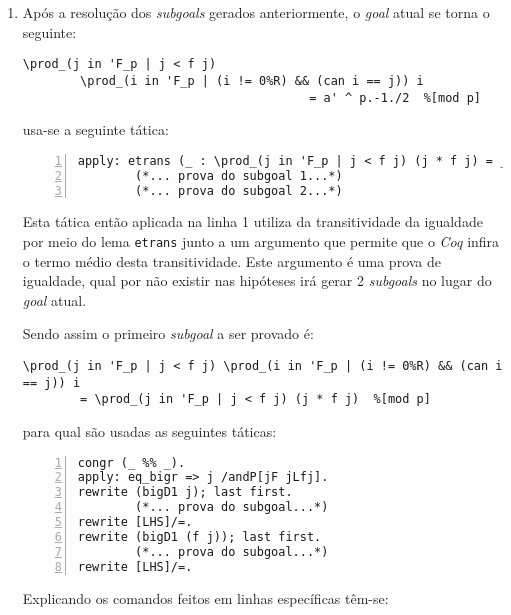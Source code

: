 \begin{enumerate}[label=\textbf{\roman*.}]
\begin{enumerate}
                Nesta subprova usa-se então o lema \lstinline[language=coq]|partition_big| com \lstinline[language=coq]|P i| sendo a condição $(i \neq 0)$, \lstinline[language=coq]|p| sendo a função $can$ e \lstinline[language=coq]|Q j| sendo a condição $(j < f(j))$. Após o uso de tal lema é então necessário provar mais um subgoal (que não é printado exatamente da seguinte forma mas é equivalente a tal): 
                \begin{lstlisting}[language=coq,frame=single,tabsize=1]
\forall i : 'F_p, i != 0%R -> can i < (a %% p * ((can i)^-1)%R) %% p
                \end{lstlisting}
                
        \end{enumerate}

        \item Após a resolução dos \textit{subgoals} gerados anteriormente, o \textit{goal} atual se torna o seguinte:
                \begin{lstlisting}[language=coq,frame=single,tabsize=1]
\prod_(j in 'F_p | j < f j) 
        \prod_(i in 'F_p | (i != 0%R) && (can i == j)) i
                                        = a' ^ p.-1./2  %[mod p]
                \end{lstlisting}
        usa-se a seguinte tática:
                \begin{lstlisting}[language=coq,frame=single, numbers=left,stepnumber=1,tabsize=1]
apply: etrans (_ : \prod_(j in 'F_p | j < f j) (j * f j) = _ %[mod p]).
        (*... prova do subgoal 1...*)
        (*... prova do subgoal 2...*)
                \end{lstlisting}
        Esta tática então aplicada na linha 1 utiliza da transitividade da igualdade por meio do lema \lstinline[language=coq]|etrans| junto a um argumento que permite que o \textit{Coq} infira o termo médio desta transitividade. Este argumento é uma prova de igualdade, qual por não existir nas hipóteses irá gerar 2 \textit{subgoals} no lugar do \textit{goal} atual.

        Sendo assim o primeiro \textit{subgoal} a ser provado é:
                \begin{lstlisting}[language=coq,frame=single,tabsize=1]
\prod_(j in 'F_p | j < f j) \prod_(i in 'F_p | (i != 0%R) && (can i == j)) i
        = \prod_(j in 'F_p | j < f j) (j * f j)  %[mod p]
                \end{lstlisting}
        para qual são usadas as seguintes táticas:
                \begin{lstlisting}[language=coq,frame=single, numbers=left,stepnumber=1,tabsize=1]
congr (_ %% _). 
apply: eq_bigr => j /andP[jF jLfj].
rewrite (bigD1 j); last first.
        (*... prova do subgoal...*)
rewrite [LHS]/=.
rewrite (bigD1 (f j)); last first.
        (*... prova do subgoal...*)
rewrite [LHS]/=.
                \end{lstlisting}
        Explicando os comandos feitos em linhas específicas têm-se:
        \begin{enumerate}
                

\end{enumerate}
\end{enumerate}
